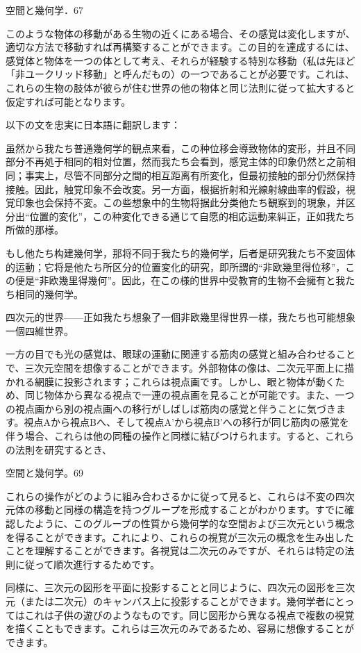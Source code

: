 \documentclass[a4paper,11pt,openany]{ltjsbook}
\begin{document}
空間と幾何学．67

このような物体の移動がある生物の近くにある場合、その感覚は変化しますが、適切な方法で移動すれば再構築することができます。この目的を達成するには、感覚体と物体を一つの体として考え、それらが経験する特別な移動（私は先ほど「非ユークリッド移動」と呼んだもの）の一つであることが必要です。これは、これらの生物の肢体が彼らが住む世界の他の物体と同じ法則に従って拡大すると仮定すれば可能となります。

以下の文を忠実に日本語に翻訳します：

虽然から我たち普通幾何学的観点来看，この种位移会導致物体的変形，并且不同部分不再処于相同的相対位置，然而我たち会看到，感覚主体的印象仍然と之前相同；事実上，尽管不同部分之間的相互距离有所変化，但最初接触的部分仍然保持接触。因此，触覚印象不会改変。另一方面，根据折射和光線射線曲率的假設，視覚印象也会保持不変。この些想象中的生物将据此分类他たち観察到的現象，并区分出“位置的変化”，この种変化できる通じて自愿的相応运動来糾正，正如我たち所做的那様。

もし他たち构建幾何学，那将不同于我たち的幾何学，后者是研究我たち不変固体的运動；它将是他たち所区分的位置変化的研究，即所謂的“非欧幾里得位移”，この便是“非欧幾里得幾何”。因此，在この様的世界中受教育的生物不会擁有と我たち相同的幾何学。

四次元的世界——正如我たち想象了一個非欧幾里得世界一様，我たち也可能想象一個四維世界。

一方の目でも光の感覚は、眼球の運動に関連する筋肉の感覚と組み合わせることで、三次元空間を想像することができます。外部物体の像は、二次元平面上に描かれる網膜に投影されます；これらは視点画です。しかし、眼と物体が動くため、同じ物体から異なる視点で一連の視点画を見ることが可能です。また、一つの視点画から別の視点画への移行がしばしば筋肉の感覚と伴うことに気づきます。視点Aから視点Bへ、そして視点A'から視点B'への移行が同じ筋肉の感覚を伴う場合、これらは他の同種の操作と同様に結びつけられます。すると、これらの法則を研究するとき、

空間と幾何学。69

これらの操作がどのように組み合わさるかに従って見ると、これらは不変の四次元体の移動と同様の構造を持つグループを形成することがわかります。すでに確認したように、このグループの性質から幾何学的な空間および三次元という概念を得ることができます。これにより、これらの視覚が三次元の概念を生み出したことを理解することができます。各視覚は二次元のみですが、それらは特定の法則に従って順次進行するためです。

同様に、三次元の図形を平面に投影することと同じように、四次元の図形を三次元（または二次元）のキャンバス上に投影することができます。幾何学者にとってはこれは子供の遊びのようなものです。同じ図形から異なる視点で複数の視覚を描くこともできます。これらは三次元のみであるため、容易に想像することができます。
\end{document}
